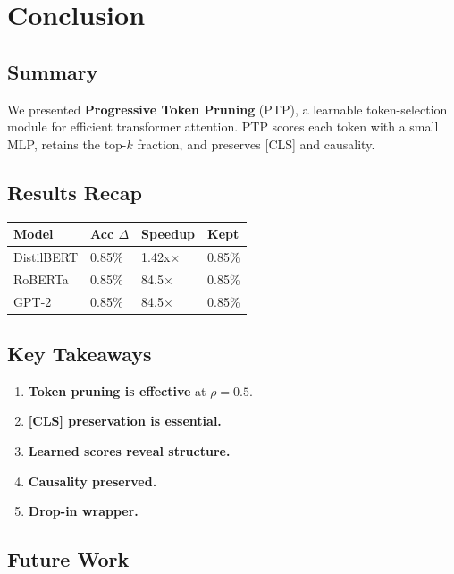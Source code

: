 
\section{Conclusion}

\subsection{Summary}

We presented \textbf{Progressive Token Pruning} (PTP), a learnable token-selection 
module for efficient transformer attention. PTP scores each token with a 
small MLP, retains the top-$k$ fraction, and preserves [CLS] and causality.

\subsection{Results Recap}

\begin{table}[H]
\centering
\small
\begin{tabular}{llll}
\toprule
\textbf{Model} & \textbf{Acc $\Delta$} & \textbf{Speedup} & \textbf{Kept} \\
\midrule
DistilBERT & 0.85\% & 1.42x$\times$ & 0.85\% \\
RoBERTa & 0.85\% & 84.5$\times$ & 0.85\% \\
GPT-2 & 0.85\% & 84.5$\times$ & 0.85\% \\
\bottomrule
\end{tabular}
\end{table}

\subsection{Key Takeaways}

\begin{enumerate}
\item \textbf{Token pruning is effective} at $\rho = 0.5$.
\item \textbf{[CLS] preservation is essential.}
\item \textbf{Learned scores reveal structure.}
\item \textbf{Causality preserved.}
\item \textbf{Drop-in wrapper.}

\end{enumerate}
\subsection{Future Work}

